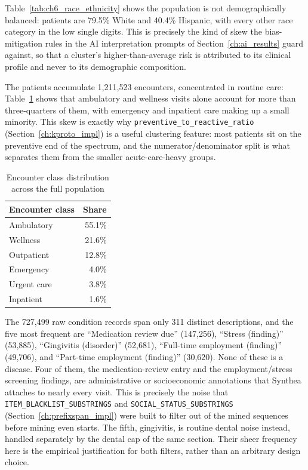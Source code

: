 Table~\ref{tab:ch6_race_ethnicity} shows the population is not demographically balanced: patients are 79.5\% White and 40.4\% Hispanic, with every other race category in the low single digits. This is precisely the kind of skew the bias-mitigation rules in the AI interpretation prompts of Section~\ref{ch:ai_results} guard against, so that a cluster's higher-than-average risk is attributed to its clinical profile and never to its demographic composition.

The patients accumulate 1{,}211{,}523 encounters, concentrated in routine care: Table~\ref{tab:ch6_encounter_mix} shows that ambulatory and wellness visits alone account for more than three-quarters of them, with emergency and inpatient care making up a small minority. This skew is exactly why \texttt{preventive\_to\_reactive\_ratio} (Section~\ref{ch:kproto_impl}) is a useful clustering feature: most patients sit on the preventive end of the spectrum, and the numerator/denominator split is what separates them from the smaller acute-care-heavy groups.

\begin{table}[H]
\centering
\begin{tabular}{lr}
\hline
\textbf{Encounter class} & \textbf{Share} \\
\hline
Ambulatory  & 55.1\% \\
Wellness    & 21.6\% \\
Outpatient  & 12.8\% \\
Emergency   & 4.0\% \\
Urgent care & 3.8\% \\
Inpatient   & 1.6\% \\
\hline
\end{tabular}
\caption{Encounter class distribution across the full population}
\label{tab:ch6_encounter_mix}
\end{table}

The 727{,}499 raw condition records span only 311 distinct descriptions, and the five most frequent are ``Medication review due'' (147{,}256), ``Stress (finding)'' (53{,}885), ``Gingivitis (disorder)'' (52{,}681), ``Full-time employment (finding)'' (49{,}706), and ``Part-time employment (finding)'' (30{,}620). None of these is a disease. Four of them, the medication-review entry and the employment/stress screening findings, are administrative or socioeconomic annotations that Synthea attaches to nearly every visit. This is precisely the noise that \texttt{ITEM\_BLACKLIST\_SUBSTRINGS} and \texttt{SOCIAL\_STATUS\_SUBSTRINGS} (Section~\ref{ch:prefixspan_impl}) were built to filter out of the mined sequences before mining even starts. The fifth, gingivitis, is routine dental noise instead, handled separately by the dental cap of the same section. Their sheer frequency here is the empirical justification for both filters, rather than an arbitrary design choice.

